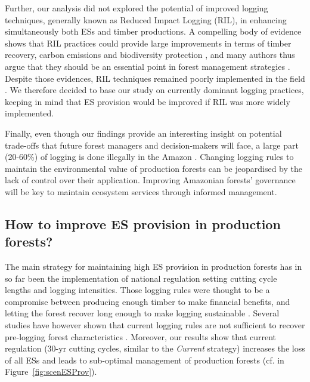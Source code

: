 \documentclass{article}
\begin{document}
Further, our analysis did not explored the potential of improved logging techniques, generally known as Reduced Impact Logging (RIL), in enhancing simultaneously both ESs and timber productions. A compelling body of evidence shows that RIL practices could provide large improvements in terms of timber recovery, carbon emissions and biodiversity protection \cite{Putz2008c,West2014,Tobler2018,Griscom2019}, and many authors thus argue that they should be an essential point in forest management strategies \cite{Griscom2018,Runting2018}. Despite those evidences, RIL techniques remained poorly implemented in the field \cite{Blaser2011}. We therefore decided to base our study on currently dominant logging practices, keeping in mind that ES provision would be improved if RIL was more widely implemented. 

Finally, even though our findings provide an interesting insight on potential trade-offs that future forest managers and decision-makers will face, a large part (20-60\%) of logging is done illegally in the Amazon \cite{Finer2014,Brancalion2018}. Changing logging rules to maintain the environmental value of production forests can be jeopardised by the lack of control over their application. Improving Amazonian forests' governance will be key to maintain ecosystem services through informed management. 

\subsection{How to improve ES provision in production forests?}

The main strategy for maintaining high ES provision in production forests has in so far been the implementation of national regulation setting cutting cycle lengths and logging intensities. 
Those logging rules were thought to be a compromise between producing enough timber to make financial benefits, and letting the forest recover long enough to make logging sustainable \cite{Seydack2012}.
Several studies have  however shown that current logging rules are not sufficient to recover pre-logging forest characteristics \cite{Zimmerman2012}.
Moreover, our results show that current regulation (30-yr cutting cycles, similar to the \textit{Current} strategy) increases the loss of all ESs and leads to sub-optimal management of production forests (cf.  in Figure~\ref{fig:scenESProv}).  
\end{document}
